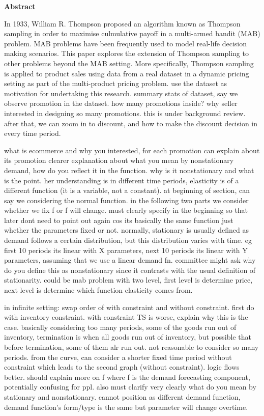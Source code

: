 \documentclass[a4paper]{article}
\begin{document}
\pagebreak
\begin{center}
	\large
	\textbf{Abstract}
	\vspace{1cm}
\end{center}	
	\large
	In 1933, William R. Thompson proposed an algorithm known as Thompson sampling in order to maximise culmulative payoff in a multi-armed bandit (MAB) problem. MAB problems have been frequently used to model real-life decision making scenarios. This paper explores the extension of Thompson sampling to other problems beyond the MAB setting. More specifically, Thompson sampling is applied to product sales using data from a real dataset in a dynamic pricing setting as part of the multi-product pricing problem. 
	\newline
	\newline
		use the dataset as motivation for undertaking this research. summary stats of dataset, say we observe promotion in the dataset. how many promotions inside? why seller interested in designing so many promotions. this is under background review. after that, we can zoom in to discount, and how to make the discount decision in every time period. 
	
	what is ecommerce and why you interested, for each promotion can explain about its promotion
	\newpage
	clearer explanation about what you mean by nonstationary demand, how do you reflect it in the function. why is it nonstationary and what is the point. her understanding is in different time periods, elasticity is of a different function (it is a variable, not a constant). at beginning of section, can say we considering the normal function. in the following two parts we consider whether we fix f or f will change. must clearly specify in the beginning so that later dont need to point out again cos its basically the same function just whether the parameters fixed or not. 
	normally, stationary is usually defined as demand follows a certain distribution, but this distribution varies with time. eg first 10 periods its linear with X parameters, next 10 periods its linear with Y parameters, assuming that we use a linear demand fn. committee might ask why do you define this as nonstationary since it contrasts with the usual definition of stationarity. could be mab problem with two level, first level is determine price, next level is determine which function elasticity comes from. 
	
	in infinite setting: swap order of with constraint and without constraint. first do with inventory constraint. with constraint TS is worse, explain why this is the case. basically considering too many periods, some of the goods run out of inventory, termination is when all goods run out of inventory, but possible that before termination, some of them alr run out. not reasonable to consider so many periods. from the curve, can consider a shorter fixed time period without constraint which leads to the second graph (without constraint). logic flows better. should explain more on f where f is the demand forecasting component, potentially confusing for ppl. also must clarify very clearly what do you mean by stationary and nonstationary. cannot position as different demand function, demand function's form/type is the same but parameter will change overtime. 
	
\end{document}
